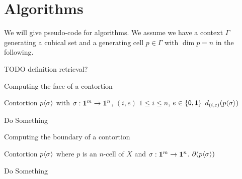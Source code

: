 \section{Algorithms}

We will give pseudo-code for algorithms. We assume we have a context $\Gamma$
generating a cubical set and a generating cell $p \in \Gamma$ with $\dim{p} = n$ in the
following.

TODO definition retrieval?

\begin{algorithm}[H]
  \caption{Computing the face of a contortion}
  \label{alg:boundary}
  \begin{algorithmic}
    \Require Contortion $\cont{p}{\sigma}$ with $\sigma : \mathbf{1}^{m} \to
    \mathbf{1}^{n}$, $(i,e)$  $1 \leq i \leq n$, $e \in \{\mathsf{0}, \mathsf{1} \}$
    \Ensure $\dmap{i}{e}(\cont{p}{\sigma})$
    
    \State Do Something
    \EndProcedure
  \end{algorithmic}
\end{algorithm}


\begin{algorithm}[H]
  \caption{Computing the boundary of a contortion}
  \label{alg:boundary}
  \begin{algorithmic}
    \Require Contortion $\cont{p}{\sigma}$ where $p$ is an $n$-cell of $X$ and $\sigma : \mathbf{1}^{m} \to \mathbf{1}^{n}$.
    \Ensure $\boundary{\cont{p}{\sigma}}$
    
    \State Do Something
    \EndProcedure
  \end{algorithmic}
\end{algorithm}



    
